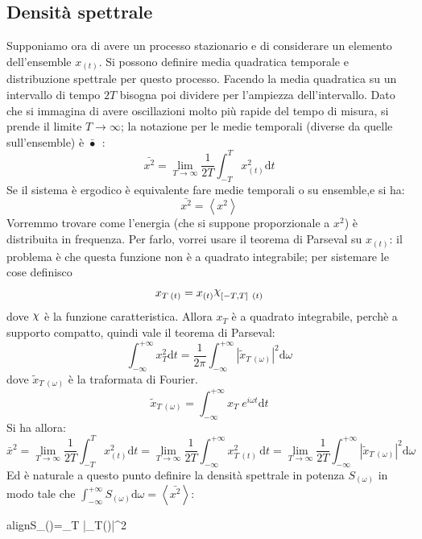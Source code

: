 \documentclass[a4paper,12pt]{article}
\renewcommand{\arg}[1]{_{(#1)}}
\newcommand{\boxedeq}[2]{\begin{empheq}[box={\fboxsep=6pt\fbox}]{align}\label{#1}#2\end{empheq}}
\theoremstyle{plain}
\theoremstyle{definition}
\newcommand{\f}[2]{\frac{#1}{#2}}
\newcommand{\ave}[1]{\left\langle#1\right\rangle }
\DeclareRobustCommand{\rchi}{{\mathpalette\irchi\relax}}
\newcommand{\irchi}[2]{\raisebox{\depth}{$#1\chi$}} %
\renewcommand{\d}{\text{d}}
\theoremstyle{remark}
\begin{document}
\subsection{Densità spettrale}
Supponiamo ora di avere un processo stazionario e di considerare un elemento dell'ensemble $x_{(t)}$. Si possono definire media quadratica temporale e distribuzione spettrale per questo processo.
Facendo la media quadratica su un intervallo di tempo $2T$ bisogna poi dividere per l'ampiezza dell'intervallo. Dato che si immagina di avere oscillazioni molto più rapide del tempo di misura, si prende il limite $T\rightarrow \infty$; la notazione per le medie temporali (diverse da quelle sull'ensemble) è $\bar{\bullet}\:\:$:
\[\bar{{x^2}}=\lim_{T\rightarrow\infty}\frac{1}{2T} \int_{-T}^{T} x^2\arg{t}\d t		\]
Se il sistema è ergodico è equivalente fare medie temporali o su ensemble,e si ha:
\[\bar{{x^2}}=\ave{x^2}\]
Vorremmo trovare come l'energia (che si suppone proporzionale a $x^2$) è distribuita in frequenza.
Per farlo, vorrei usare il teorema di Parseval su $x\arg{t}$: il problema è che questa funzione non è a quadrato integrabile; per sistemare le cose definisco \[x_{T\:(t)}=x\arg{t} \rchi_{[-T,T]\:\:(t)}		\]
dove $\rchi$ è la funzione caratteristica.
Allora $x_T$ è a quadrato integrabile, perchè a supporto compatto, quindi vale il teorema di Parseval:
\[\int_{-\infty}^{+\infty} x^2_T \d t=\f{1}{2\pi} \int_{-\infty}^{+\infty}	|\tilde{x}_{T\:(\omega)}|^2	\d \omega\]
dove $\tilde{x}_{T\:(\omega)}$ è la traformata di Fourier.
\[\tilde{x}_{T\:(\omega)}=\int_{-\infty}^{+\infty} x_T \;e^{i \omega t} \d t\]
Si ha allora:
\[  \bar{x}^2=\lim_{T\rightarrow\infty}\frac{1}{2T} \int_{-T}^{T} x^2\arg{t}\d t=\lim_{T\rightarrow\infty}\frac{1}{2T} \int_{-\infty}^{+\infty} x^2_{T\:(t)} \,\d t	=\lim_{T\rightarrow\infty}\frac{1}{2T} \int_{-\infty}^{+\infty}	|\tilde{x}_{T\:(\omega)}|^2 \d\omega		\]
Ed è naturale a questo punto definire la densità spettrale in potenza $S\arg{\omega}$ in modo tale che $\int_{-\infty}^{+\infty} S\arg{\omega} \d \omega=\ave{\bar{x^2}}$:
\boxedeq{spectraldensity}{S_{(\omega)}=\ave{\lim_{T\rightarrow\infty}\frac{1}{2T(2\pi)}	 	|\tilde{x}_{T\:(\omega)}|^2 }	}
\end{document}
